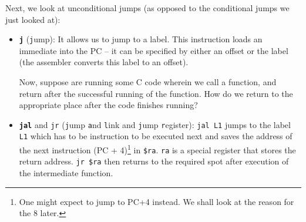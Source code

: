 \documentclass{article}
\begin{document}
		Next, we look at unconditional jumps (as opposed to the conditional jumps we just looked at):

		\begin{itemize}
			\item \textbf{\texttt{j}} (\texttt{j}ump): It allows us to jump to a label. This instruction loads an immediate into the PC -- it can be specified by either an offset or the label (the assembler converts this label to an offset).

			Now, suppose are running some C code wherein we call a function, and return after the successful running of the function. How do we return to the appropriate place after the code finishes running?

			\item \texttt{\textbf{jal}} and \texttt{jr} (\texttt{j}ump \texttt{a}nd \texttt{l}ink and \texttt{j}ump \texttt{r}egister): \texttt{jal L1} jumps to the label \texttt{L1} which has to be instruction to be executed next and saves the address of the next instruction (PC + 4)\footnote{One might expect to jump to PC+4 instead. We shall look at the reason for the 8 later.} in \texttt{\$ra}. \texttt{ra} is a special register that stores the return address. \texttt{jr \$ra} then returns to the required spot after execution of the intermediate function.
		\end{itemize}
\end{document}
